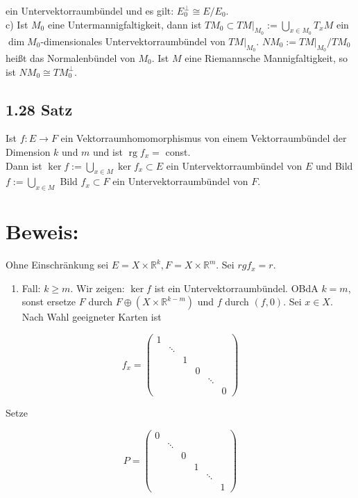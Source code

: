 \documentclass[10pt, letterpaper]{article}
\begin{document}
ein Untervektorraumbündel und es gilt: $E_{0}^{\perp} \cong E / E_{0}$.\\
c) Ist $M_{0}$ eine Untermannigfaltigkeit, dann ist $\left.T M_{0} \subset T M\right|_{M_{0}}:=\bigcup_{x \in M_{0}} T_{x} M$ ein $\operatorname{dim} M_{0}$-dimensionales Untervektorraumbündel von $\left.T M\right|_{M_{0}}$. $N M_{0}:=\left.T M\right|_{M_{0}} / T M_{0}$ heißt das Normalenbündel von $M_{0}$. Ist $M$ eine Riemannsche Mannigfaltigkeit, so ist $N M_{0} \cong T M_{0}^{\perp}$.

\subsection*{1.28 Satz}
Ist $f: E \rightarrow F$ ein Vektorraumhomomorphismus von einem Vektorraumbündel der Dimension $k$ und $m$ und ist $\operatorname{rg} f_{x}=$ const.\\
Dann ist $\operatorname{ker} f:=\bigcup_{x \in M} \operatorname{ker} f_{x} \subset E$ ein Untervektorraumbündel von $E$ und Bild $f:=\bigcup_{x \in M}$ Bild $f_{x} \subset F$ ein Untervektorraumbündel von $F$.

\section*{Beweis:}
Ohne Einschränkung sei $E=X \times \mathbb{R}^{k}, F=X \times \mathbb{R}^{m}$. Sei $r g f_{x}=r$.

\begin{enumerate}
  \item Fall: $k \geq m$. Wir zeigen: $\operatorname{ker} f$ ist ein Untervektorraumbündel. OBdA $k=m$, sonst ersetze $F$ durch $F \oplus\left(X \times \mathbb{R}^{k-m}\right)$ und $f$ durch $(f, 0)$. Sei $x \in X$. Nach Wahl geeigneter Karten ist
\end{enumerate}

$$
f_{x}=\left(\begin{array}{cccccc}
1 & & & & & \\
& \ddots & & & & \\
& & 1 & & & \\
& & & 0 & & \\
& & & & \ddots & \\
& & & & & 0
\end{array}\right)
$$

Setze

$$
P=\left(\begin{array}{cccccc}
0 & & & & & \\
& \ddots & & & & \\
& & 0 & & & \\
& & & 1 & & \\
& & & & \ddots & \\
& & & & & 1
\end{array}\right)
$$
\end{document}
